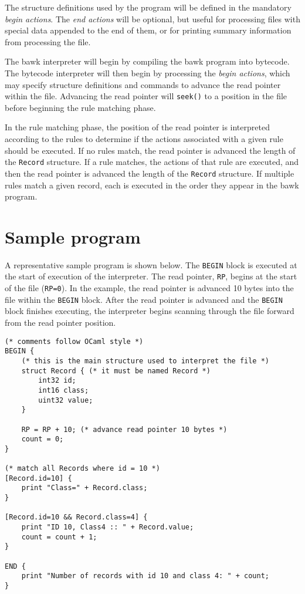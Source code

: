 \documentclass[letterpaper,11pt]{article}
\begin{document}
The structure definitions used by the program will be defined in the mandatory \textsl{begin actions}.  The \textsl{end actions} will be optional, but useful for processing files with special data appended to the end of them, or for printing summary information from processing the file.

The bawk interpreter will begin by compiling the bawk program into bytecode.  The bytecode interpreter will then begin by processing the \textsl{begin actions}, which may specify structure definitions and commands to advance the read pointer within the file.  Advancing the read pointer will \texttt{seek()} to a position in the file before beginning the rule matching phase.

In the rule matching phase, the position of the read pointer is interpreted according to the rules to determine if the actions associated with a given rule should be executed.  If no rules match, the read pointer is advanced the length of the \texttt{Record} structure.  If a rule matches, the actions of that rule are executed, and then the read pointer is advanced the length of the \texttt{Record} structure.  If multiple rules match a given record, each is executed in the order they appear in the bawk program.

\section{Sample program}

A representative sample program is shown below.  The \texttt{BEGIN} block is executed at the start of execution of the interpreter.  The read pointer, \texttt{RP}, begins at the start of the file (\texttt{RP=0}).  In the example, the read pointer is advanced 10 bytes into the file within the \texttt{BEGIN} block.  After the read pointer is advanced and the \texttt{BEGIN} block finishes executing, the interpreter begins scanning through the file forward from the read pointer position.
\begin{lstlisting}
(* comments follow OCaml style *)
BEGIN {
	(* this is the main structure used to interpret the file *)
	struct Record { (* it must be named Record *)
		int32 id;
		int16 class;
		uint32 value;
	}

	RP = RP + 10; (* advance read pointer 10 bytes *)
	count = 0;
}

(* match all Records where id = 10 *)
[Record.id=10] {
	print "Class=" + Record.class;
}

[Record.id=10 && Record.class=4] {
	print "ID 10, Class4 :: " + Record.value;
	count = count + 1;
}

END {
	print "Number of records with id 10 and class 4: " + count;
}
\end{lstlisting}
\end{document}
